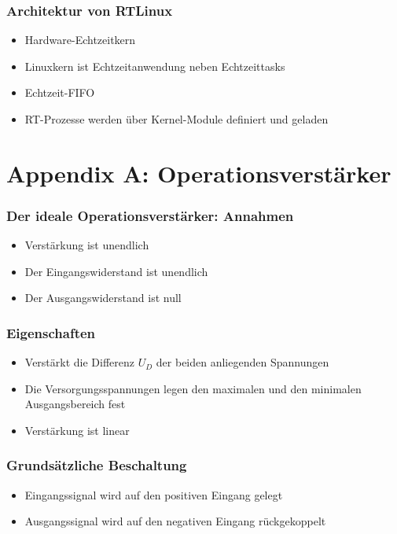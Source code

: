 \subsubsection{Architektur von RTLinux}
\begin{itemize}
	\item Hardware-Echtzeitkern
	\item Linuxkern ist Echtzeitanwendung neben Echtzeittasks
	\item Echtzeit-FIFO
	\item RT-Prozesse werden über Kernel-Module definiert und geladen
\end{itemize}



\section{Appendix A: Operationsverstärker}

\subsubsection{Der ideale Operationsverstärker: Annahmen}
\begin{itemize}
	\item Verstärkung ist unendlich
	\item Der Eingangswiderstand ist unendlich
	\item Der Ausgangswiderstand ist null
\end{itemize}

\subsubsection{Eigenschaften}
\begin{itemize}
	\item Verstärkt die Differenz $U_D$ der beiden anliegenden Spannungen
	\item Die Versorgungsspannungen legen den maximalen und den minimalen Ausgangsbereich fest
	\item Verstärkung ist linear
\end{itemize}

\subsubsection{Grundsätzliche Beschaltung}
\begin{itemize}
	\item Eingangssignal wird auf den positiven Eingang gelegt
	\item Ausgangssignal wird auf den negativen Eingang rückgekoppelt
\end{itemize}

